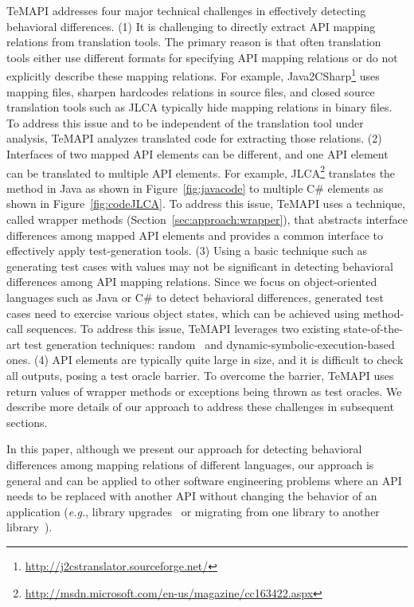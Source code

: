 TeMAPI addresses four major technical challenges in effectively detecting behavioral differences. (1) It is challenging to directly extract API mapping relations from translation tools. The primary reason is that often translation tools either use different formats for specifying API mapping relations or do not explicitly describe these mapping relations. For example, Java2CSharp\footnote{\url{http://j2cstranslator.sourceforge.net/}} uses mapping files, sharpen hardcodes relations in source files, and closed source translation tools such as JLCA typically hide mapping relations in binary files. To address this issue and to be independent of the translation tool under analysis, TeMAPI analyzes translated code for extracting those relations. (2) Interfaces of two mapped API elements can be different, and one API element can be translated to multiple API elements. For example, JLCA\footnote{\url{http://msdn.microsoft.com/en-us/magazine/cc163422.aspx}} translates the  method in Java as shown in Figure~\ref{fig:javacode} to multiple C\# elements as shown in Figure~\ref{fig:codeJLCA}.
To address this issue, TeMAPI uses a technique, called wrapper methods (Section~\ref{sec:approach:wrapper}), that abstracts interface differences among mapped API elements and provides a common interface to effectively apply test-generation tools. (3) Using a basic technique such as generating test cases with  values may not be significant in detecting behavioral differences among API mapping relations. Since we focus on object-oriented languages such as Java or C\# to detect behavioral differences, generated test cases need to exercise various object states, which can be achieved using method-call sequences. To address this issue, TeMAPI leverages two existing state-of-the-art test generation techniques: random~\cite{pacheco2007feedback} and dynamic-symbolic-execution-based~\cite{koushik:cute, godefroid:dart, tillmann2008pex} ones. (4) API elements are typically quite large in size, and it is difficult to check all outputs, posing a test oracle barrier. To overcome the barrier, TeMAPI uses return values of wrapper methods or exceptions being thrown as test oracles. We describe more details of our approach to address these challenges in subsequent sections.

In this paper, although we present our approach for detecting behavioral differences among mapping relations of different languages, our approach is general and can be applied to other software engineering problems where an API needs to be replaced with another API without changing the behavior of an application (\emph{e.g.}, library upgrades~\cite{Kawrykow:2009} or migrating from one library to another library~\cite{nita2010using}).

